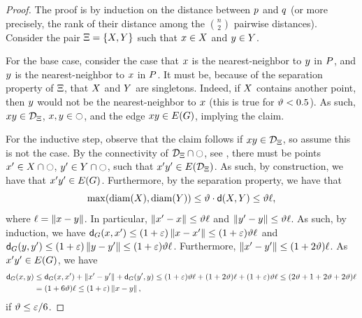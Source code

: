 \documentclass[12pt]{article}%
\begin{document}
\begin{proof}
    The proof is by induction on the distance between $p$ and $q$
    (or more precisely, the rank of their distance among the
    $\binom{n}{2}$ pairwise distances).  Consider the pair
    $\Xi = \{ X, Y \}$ such that $x \in X$ and
    $y \in Y$.

    For the base case, consider the case that $x$ is the
    nearest-neighbor to $y$ in $P$, and $y$ is the
    nearest-neighbor to $x$ in $P$.  It must be, because of the
    separation property of $\Xi$, that $X$ and $Y$ are
    singletons. Indeed, if $X$ contains another point, then $y$
    would not be the nearest-neighbor to $x$ (this is true for
    $\vartheta < 0.5$). As such, $x y \in \mathcal{D}_\Xi$,
    $x, y \in \ocircle$, and the edge $\px \py \in \EGX{\G}$,
    implying the claim.

    For the inductive step, observe that the claim follows if
    $x y \in \mathcal{D}_\Xi$, so assume this is not the case. By the
    connectivity of $\mathcal{D}_\Xi \cap \ocircle$, see
    , there must be points
    $x' \in X \cap \ocircle$, $y' \in Y \cap \ocircle$, such that
    $\px'\py' \in \EGX{ \DT_\Pair}$. As such, by construction, we have
    that $\px'\py' \in \EGX{\G}$. Furthermore, by the separation
    property, we have that
    \begin{equation*}
        \max \pth{ \diameterX{\PSX}, \diameterX{\PSY} }%
        \leq%
        \epsA \cdot \dsY{\PSX}{\PSY}%
        \leq%
        \epsA \ell,
    \end{equation*}
    where $\ell = \left\| x - y \right\|$. In particular,
    $\left\| x' - x \right\| \leq \vartheta \ell$ and
    $\left\| y' - y \right\| \leq \vartheta \ell$. As such, by induction, we have
    $\dGZ{\G}{\px}{\px'} \leq (1+\eps)\dY{\px}{\px'} \leq
    (1+\eps)\epsA \ell$ and
    $\dGZ{\G}{\py}{\py'} \leq (1+\eps)\dY{\py}{\py'} \leq
    (1+\eps)\epsA \ell$.  Furthermore,
    $\left\| x' - y' \right\| \leq (1+2\vartheta)\ell$. As $\px'\py' \in \EGX{\G}$,
    we have
    \begin{align*}
      \dGZ{\G}{\px}{\py}%
      &\leq%
        \dGZ{\G}{\px}{\px'}%
        +\dY{\px'}{\py'}
        +
        \dGZ{\G}{\py'}{\py}%
        \leq%
        (1+\eps)\epsA \ell
        +(1+2\epsA)\ell
        + (1+\eps)\epsA \ell
        \leq%
        \pth{ 2\epsA +1+2\epsA + 2\epsA } \ell
      \\&%
      =%
      \pth{ 1+ 6\epsA  } \ell
      \leq%
      \pth{ 1+ \eps  } \dY{\px}{\py},
    \end{align*}
    if $\vartheta \leq \varepsilon/6$.
\end{proof}
\end{document}
